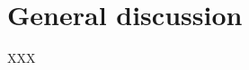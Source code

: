 \documentclass[11pt,a4paper]{article}
\begin{document}
\section{General discussion}

XXX




% 


% 
%
%
%
%
%
%
%
%
\end{document}
